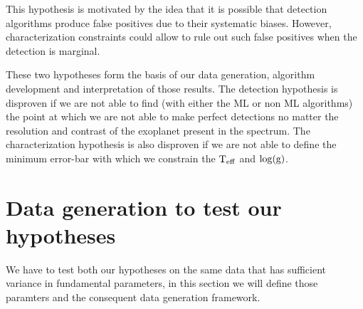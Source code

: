 This hypothesis is motivated by the idea that it is possible that detection algorithms produce false positives due to their systematic biases. 
However, characterization constraints could allow to rule out such false positives when the detection is marginal.

These two hypotheses form the basis of our data generation, algorithm development and interpretation of those results. 
The detection hypothesis is disproven if we are not able to find (with either the ML or non ML algorithms) the point at which we are not able to make perfect detections no matter the resolution and contrast of the exoplanet present in the spectrum.
The characterization hypothesis is also disproven if we are not able to define the minimum error-bar with which we constrain the $\rm{T_{eff}}$ and $\rm{\log(g)}$.

\section{Data generation to test our hypotheses}
We have to test both our hypotheses on the same data that has sufficient variance in fundamental parameters, in this section we will define those paramters and the consequent data generation framework.
